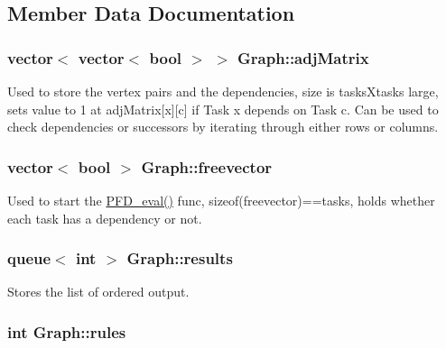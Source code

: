 \subsection{Member Data Documentation}
\hypertarget{structGraph_a25439b7cad72199504e1fdd1fbe70130}{
\subsubsection[{adj\-Matrix}]{\setlength{\rightskip}{0pt plus 5cm}vector$<$ vector$<$ bool $>$ $>$ Graph\-::adj\-Matrix}}\label{structGraph_a25439b7cad72199504e1fdd1fbe70130}


Used to store the vertex pairs and the dependencies, size is tasks\-Xtasks large, sets value to 1 at adj\-Matrix\mbox{[}x\mbox{]}\mbox{[}c\mbox{]} if Task x depends on Task c. Can be used to check dependencies or successors by iterating through either rows or columns. 

\hypertarget{structGraph_a8d3788ddc13794edb1426c6c1960b4c6}{
\subsubsection[{freevector}]{\setlength{\rightskip}{0pt plus 5cm}vector$<$ bool $>$ Graph\-::freevector}}\label{structGraph_a8d3788ddc13794edb1426c6c1960b4c6}


Used to start the \hyperlink{structGraph_ac6a0946ed59ad938626736c9c5e084e6}{P\-F\-D\-\_\-eval()} func, sizeof(freevector)==tasks, holds whether each task has a dependency or not. 

\hypertarget{structGraph_a97da3b3f97afbd334c70b354a3be4551}{
\subsubsection[{results}]{\setlength{\rightskip}{0pt plus 5cm}queue$<$ int $>$ Graph\-::results}}\label{structGraph_a97da3b3f97afbd334c70b354a3be4551}


Stores the list of ordered output. 

\hypertarget{structGraph_a7d540d84c08510deb0f2b0692ed5afcd}{
\subsubsection[{rules}]{\setlength{\rightskip}{0pt plus 5cm}int Graph\-::rules}}\label{structGraph_a7d540d84c08510deb0f2b0692ed5afcd}


